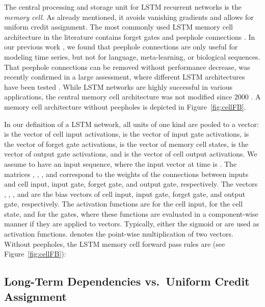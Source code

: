 \documentclass{article}
\begin{document}
\begin{appendices}
The central processing and storage unit for LSTM recurrent networks is
the {\em memory cell}. As already mentioned, it avoids vanishing gradients and allows for
uniform credit assignment.
The most commonly used LSTM memory cell architecture in the 
literature \cite{Graves:05,Schmidhuber:15} 
contains forget gates \cite{Gers:99a,Gers:00}
and peephole connections \cite{Gers:00a}. 
In our previous work \cite{Hochreiter:01,Hochreiter:07}, 
we found that peephole connections are 
only useful for modeling time series, but not for 
language, meta-learning, or biological sequences. 
That peephole connections can be removed without performance decrease, 
was recently confirmed in a large assessment, where 
different LSTM architectures have been tested \cite{Greff:15}.
While LSTM networks are highly successful in various applications, 
the central memory cell architecture was not modified since 2000 \cite{Schmidhuber:15}.
A memory cell architecture without peepholes is depicted in
Figure~\ref{fig:cellFB}. 

In our definition of a LSTM network, all units of one kind are
pooled to a vector:  is the vector of cell input
activations,  is the vector of input gate
activations,   is the vector of forget gate
activations,   is the vector of memory cell states,
 is the vector of output gate
activations, and  is the vector of cell output 
activations.
We assume to have an input sequence, where the input vector at 
time  is . The matrices , ,
, and  correspond to the
weights of the connections between inputs and cell input, input gate, forget gate, and
output gate, respectively.
The vectors  , ,
, and  are the bias vectors of cell input, input gate, forget gate, and
output gate, respectively.
The activation functions are  for the cell input,  for the cell
state, and  for the gates, where these functions are evaluated in a
component-wise manner if they are applied to vectors.
Typically, either the sigmoid  or
 are used as activation functions.
 denotes the point-wise multiplication
of two vectors. Without peepholes, the LSTM memory cell forward pass rules
are (see Figure~\ref{fig:cellFB}):


\subsection{Long-Term Dependencies vs.\ Uniform Credit Assignment}


\end{appendices}
\end{document}
